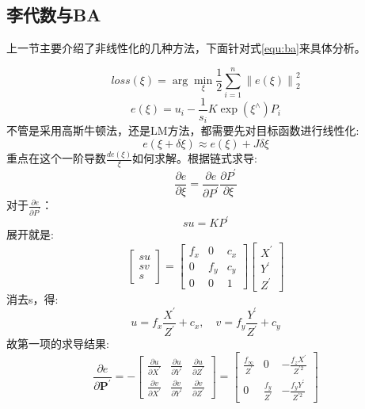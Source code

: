 \subsection{李代数与BA}
上一节主要介绍了非线性化的几种方法，下面针对式\ref{equ:ba}来具体分析。\par
$$loss(\xi)=\arg \min _{\xi} \frac{1}{2} \sum_{i=1}^{n}\left\|e(\xi)\right\|_{2}^{2}$$
$$e(\xi)=u_{i}-\frac{1}{s_{i}} K \exp \left(\xi^{\wedge}\right) P_{i}$$
不管是采用高斯牛顿法，还是LM方法，都需要先对目标函数进行线性化:
\begin{equation}
e(\xi+\delta \xi) \approx e(\xi)+J \delta \xi
\end{equation}
重点在这个一阶导数$\frac{de(\xi)}{\xi}$如何求解。根据链式求导:
\begin{equation}
\frac{\partial e}{\partial \xi}=\frac{\partial e}{\partial P^{\prime}} \frac{\partial P^{\prime}}{\partial \xi}
\end{equation}
对于$\frac{\partial e}{\partial P^{\prime}}$：
\begin{equation}
s u=K P^{\prime}
\end{equation}
展开就是:
\begin{equation}
\left[ \begin{array}{c}{s u} \\ {s v} \\ {s}\end{array}\right]=\left[ \begin{array}{ccc}{f_{x}} & {0} & {c_{x}} \\ {0} & {f_{y}} & {c_{y}} \\ {0} & {0} & {1}\end{array}\right] \left[ \begin{array}{l}{X^{\prime}} \\ {Y^{\prime}} \\ {Z^{\prime}}\end{array}\right]
\end{equation}
消去s，得:
\begin{equation}
u=f_{x} \frac{X^{\prime}}{Z^{\prime}}+c_{x}, \quad v=f_{y} \frac{Y^{\prime}}{Z^{\prime}}+c_{y}
\end{equation}
故第一项的求导结果:
\begin{equation}
\frac{\partial e}{\partial \boldsymbol{P}^{\prime}}=-\left[ \begin{array}{ccc}{\frac{\partial u}{\partial X^{\prime}}} & {\frac{\partial u}{\partial Y^{\prime}}} & {\frac{\partial u}{\partial Z^{\prime}}} \\ {\frac{\partial v}{\partial X^{\prime}}} & {\frac{\partial v}{\partial Y^{\prime}}} & {\frac{\partial v}{\partial Z^{\prime}}}\end{array}\right]=\left[ \begin{array}{ccc}{\frac{f_{\infty}}{Z^{\prime}}} & {0} & {-\frac{f_{z} X^{\prime}}{Z^{\prime 2}}} \\ {0} & {\frac{f_{y}}{Z^{\prime}}} & {-\frac{f_{y} Y^{\prime}}{Z^{\prime 2}}}\end{array}\right]
\label{equ:epprime}
\end{equation}
